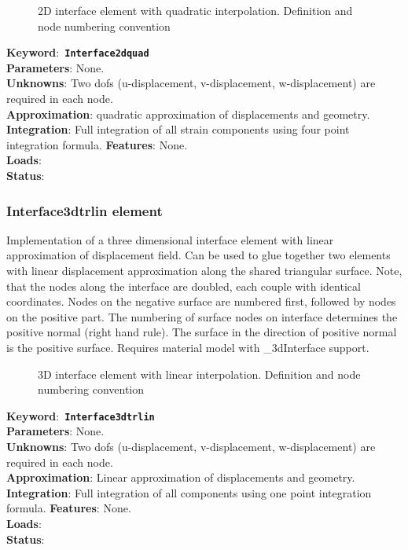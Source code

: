 \documentclass[a4paper]{article}
\newcommand{\descitem}[1]{{\noindent \bf #1}:}
\newcommand{\elemkeyword}[1]{\descitem{Keyword}~{\bf \texttt{#1}}}
\begin{document}
\begin{figure}[tb]
 \centering
 \begin{makeimage}
 
 \end{makeimage}
 \caption{2D interface element with quadratic interpolation. Definition and node numbering convention}
 \label{interf2d_quad_fig}
\end{figure}

\elemkeyword{Interface2dquad}\\
\descitem{Parameters} None.\\
\descitem{Unknowns}
Two dofs (u-displacement, v-displacement, w-displacement) are required in each node.\\
\descitem{Approximation} quadratic approximation of displacements and
geometry.
\descitem{Integration}
Full integration of all strain components using four point integration formula.
\descitem{Features} None.\\
\descitem{Loads} \\
\descitem{Status} 

\subsubsection{Interface3dtrlin element}
Implementation of a three dimensional interface element with linear
approximation of displacement field. Can be used to glue together two elements with linear displacement approximation along the shared triangular surface. Note, that the nodes along the interface are doubled, each couple with identical coordinates. Nodes on the negative surface are numbered first, followed by nodes on the positive part. The numbering of surface nodes on interface determines the positive normal (right hand rule). The surface in the direction of positive normal is the positive surface. Requires material model with \_3dInterface support.

\begin{figure}[tb]
 \centering
 \begin{makeimage}
  
 \end{makeimage}
 \caption{3D interface element with linear interpolation. Definition and node numbering convention}
 \label{interf3d_lin_fig}
\end{figure}

\elemkeyword{Interface3dtrlin}\\
\descitem{Parameters} None.\\
\descitem{Unknowns}
Two dofs (u-displacement, v-displacement, w-displacement) are required in each node.\\
\descitem{Approximation} Linear approximation of displacements and
geometry.\\
\descitem{Integration}
Full integration of all components using one point integration formula.
\descitem{Features} None.\\
\descitem{Loads} \\
\descitem{Status} 
\end{document}
